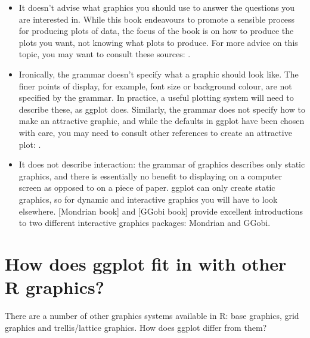 \begin{itemize}
	\item It doesn't advise what graphics you should use to answer the questions you are interested in.  While this book endeavours to promote a sensible process for producing plots of data, the focus of the book is on how to produce the plots you want, not knowing what plots to produce. For more advice on this topic, you may want to consult these sources: \citet{robbins:2004,cleveland:1993,chambers:1983,tukey:1977}.

	\item Ironically, the grammar doesn't specify what a graphic should look like.  The finer points of display, for example, font size or background colour, are not specified by the grammar.  In practice, a useful plotting system will need to describe these, as ggplot does. Similarly, the grammar does not specify how to make an attractive graphic, and while the defaults in ggplot have been chosen with care, you may need to consult other references to create an attractive plot: \citep{tufte:1990,tufte:1997,tufte:2001,tufte:2006}.

	\item It does not describe interaction: the grammar of graphics describes only static graphics, and there is essentially no benefit to displaying on a computer screen as opposed to on a piece of paper.  ggplot can only create static graphics, so for dynamic and interactive graphics you will have to look elsewhere.  [Mondrian book] and [GGobi book] provide excellent introductions to two different interactive graphics packages: Mondrian and GGobi.

\end{itemize}

\section{How does ggplot fit in with other R graphics?}

There are a number of other graphics systems available in R: base graphics, grid graphics and trellis/lattice graphics.  How does ggplot differ from them?

